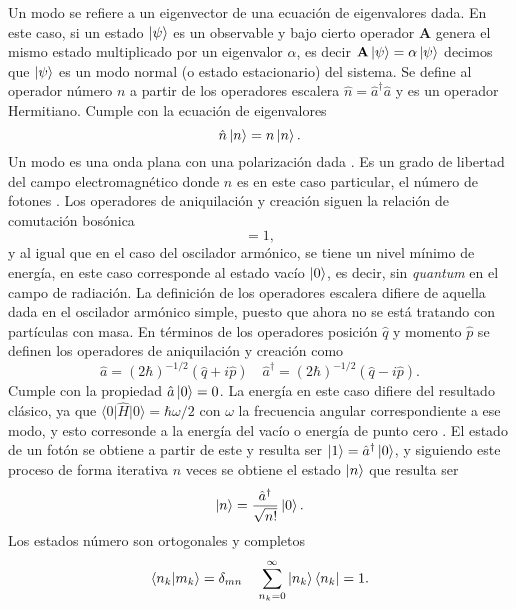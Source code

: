 Un modo se refiere a un eigenvector de una ecuación de eigenvalores dada. En este caso, si un estado $\ket{\psi}$ es un observable y bajo cierto operador $\mathbf{A}$ genera el mismo estado multiplicado por un eigenvalor $\alpha$, es decir $\mathbf{A}\ket{\psi} = \alpha \ket{\psi}$ decimos que $\ket{\psi}$ es un modo normal (o estado estacionario) del sistema.
Se define al operador número $n$ a partir de los operadores escalera $\hat{n} = \hat{a}^{\dagger}\hat{a}$ y es un operador Hermitiano. Cumple con la ecuación de eigenvalores %
\begin{equation}
  \hat{n}\ket{n} = n \ket{n}.
\end{equation}
Un modo es una onda plana con una polarización dada \cite{Agarwal_2012}. Es un grado de libertad del campo electromagnético donde $n$ es en este caso particular, el número de fotones \cite{Leonhardt}. Los operadores de aniquilación y creación siguen la relación de comutación bosónica
\begin{equation}
  [\hat{a}, \hat{a}^{\dagger}] = 1,
\end{equation}
y al igual que en el caso del oscilador armónico, se tiene un nivel mínimo de energía, en este caso corresponde al estado vacío $\ket{0}$, es decir, sin \textit{quantum} en el campo de radiación. La definición de los operadores escalera difiere de aquella dada en el oscilador armónico simple, puesto que ahora no se está tratando con partículas con masa. En términos de los operadores posición $\hat{q}$ y momento $\hat{p}$ se definen los operadores de aniquilación y creación como
\begin{equation}\label{eq:crea-anni-def}
  \hat{a} = (2\hbar)^{-1/2}(\hat{q} + i\hat{p}) \quad \hat{a}^{\dagger} = (2\hbar)^{-1/2}(\hat{q} - i\hat{p}).
\end{equation} %
Cumple con la propiedad $\hat{a} \ket{0} = 0$. La energía en este caso difiere del resultado clásico, ya que $\langle 0\vert\hat{H}\vert 0\rangle = \hbar\omega/2$ con $\omega$ la frecuencia angular correspondiente a ese modo, y esto corresonde a la energía del vacío o energía de punto cero \cite{Walls}. El estado de un fotón se obtiene a partir de este y resulta ser $\ket{1} = \hat{a}^{\dagger} \ket{0}$, y siguiendo este proceso de forma iterativa $n$ veces se obtiene el estado $\ket{n}$ que resulta ser
\begin{equation}
  \ket{n} = \frac{\hat{a}^{\dagger}}{\sqrt{n!}}\ket{0}.
\end{equation}
Los estados número son ortogonales y completos
\begin{equation}
  \braket{n_k}{m_k} = \delta_{mn} \quad \sum_{n_k = 0}^{\infty} \ket{n_k} \bra{n_k} = 1.
\end{equation}
